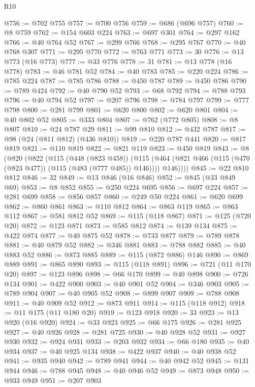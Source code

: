 \begin{lexlean}{R10}
\begin{coremodule}
@756 := @702 @755
@757 := @700 @756
@759 := @686 (@696 @757)
@760 := @8 @759
@762 := @154 @603 @224
@763 := @697 @301
@764 := @297 @162
@766 := @40 @764 @52
@767 := @299 @766
@768 := @295 @767
@770 := @40 @768 @307
@771 := @295 @770
@772 := @763 @771
@773 := 30
@776 := @13 @773 (@16 @773)
@777 := @33 @776
@778 := 31
@781 := @13 @778 (@16 @778)
@783 := @46 @781 @52
@784 := @40 @783
@785 := @220 @224
@786 := @785 @224
@787 := @785 @786
@788 := @450 @787
@789 := @450 @786
@790 := @789 @424
@792 := @40 @790 @52
@793 := @68 @792
@794 := @788 @793
@796 := @40 @794 @52
@797 := @207 @796
@798 := @784 @797
@799 := @777 @798
@800 := @281 @799
@801 := @620 @800
@802 := @620 @801
@804 := @40 @802 @52
@805 := @333 @804
@807 := @762 (@772 @805)
@808 := @8 @807
@810 := @24 @787 @29
@811 := @99 @810
@812 := @432 @787
@817 := @98 (@24 (@811 @812) (@436 @810))
@819 := @220 @787 @441
@820 := @817 @819
@821 := @110 @819
@822 := @821 @119
@823 := @450 @819
@843 := @8
    (@820
      (@822
        (@115
          (@448 (@823 @458))
          (@115 (@464 (@821 @466 (@115 (@470 (@823 @477)) (@115 (@483 (@777 @485)) @146)))) @146))))
@845 := @22 @810 @812
@846 := 32
@849 := @13 @846 (@16 @846)
@852 := @845 (@33 @849 @69)
@853 := @8 @852
@855 := @250 @224 @695
@856 := @697 @224
@857 := @281 @699
@858 := @856 @857
@860 := @249 @50 @224
@861 := @620 @699
@862 := @860 @861
@863 := @110 @812
@864 := @863 @119
@865 := @863 @112
@867 := @581 @812 @52
@869 := @115 (@118 @867)
@871 := @125 (@720 @20)
@872 := @123 @871
@873 := @585 @812
@874 := @139 @134
@875 := @422 @874
@877 := @40 @875 @52
@878 := @733 @877
@879 := @789 @878
@881 := @40 @879 @52
@882 := @346 @881
@883 := @788 @882
@885 := @40 @883 @52
@886 := @873 @885
@889 := @115 (@872 @886) @146
@890 := @869 @889
@891 := @865 @890
@893 := @115 (@118 @891)
@896 := @721 (@11 @170 @20)
@897 := @123 @896
@898 := @66 @170
@899 := @40 @898
@900 := @726 @134
@901 := @422 @900
@903 := @40 @901 @52
@904 := @346 @903
@905 := @789 @904
@907 := @40 @905 @52
@908 := @899 @907
@909 := @788 @908
@911 := @40 @909 @52
@912 := @873 @911
@914 := @115 (@118 @912)
@918 := @11 @175 (@11 @180 @20)
@919 := @123 @918
@920 := 33
@923 := @13 @920 (@16 @920)
@924 := @33 @923
@925 := @66 @175
@926 := @281 @925
@927 := @40 @926
@928 := @281 @725
@930 := @40 @928 @52
@931 := @927 @930
@932 := @924 @931
@933 := @203 @932
@934 := @66 @180
@935 := @40 @934
@937 := @40 @925 @134
@938 := @422 @937
@940 := @40 @938 @52
@941 := @935 @940
@942 := @789 @941
@944 := @40 @942 @52
@945 := @131 @944
@946 := @788 @945
@948 := @40 @946 @52
@949 := @873 @948
@950 := @933 @949
@951 := @207 @903

\end{coremodule}
\end{lexlean}
